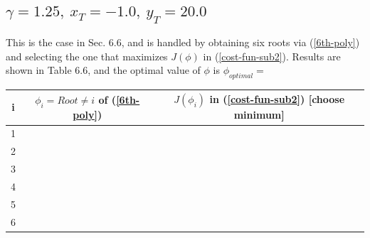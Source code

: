 \subsection{$\gamma=1.25,\ x_T=-1.0,\ y_T=20.0$}
This is the case in Sec. 6.6, and is handled by obtaining six roots via (\ref{6th-poly}) and selecting the one that maximizes $J(\phi)$ in (\ref{cost-fun-sub2}). Results are shown in Table 6.6, and the optimal value of $\phi$ is $\phi_{optimal}=$

\begin{center}
\begin{tabular}{ |c||c|c| } 
\hline
i & $\phi_i = Root\neq i$ of (\ref{6th-poly}) & $J(\phi_i)$ in (\ref{cost-fun-sub2}) [choose minimum]  \\
 \hline
 \hline
 1 &  &  \\
 \hline 
 2 &  &  \\
 \hline 
 3 &  &  \\ 
 \hline
 4 &  &  \\
  \hline
  5&  &  \\ 
   \hline
   6 &  &  \\  
  \hline
\end{tabular}
\end{center}

